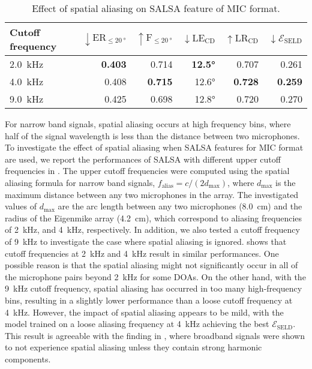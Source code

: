\documentclass[journal]{IEEEtran}
\newcommand{\Eseld}{$\mathcal{E}_\text{SELD}$\xspace}
\begin{document}
\begin{table}[t]
    \centering
    \setlength\tabcolsep{3pt}
    \caption{Effect of spatial aliasing on SALSA feature of MIC format.}
    \noindent\begin{tabularx}{\columnwidth}{Xrrrrr}
    \toprule 
        Cutoff frequency 
        & $\downarrow \text{ER}_{\le \SI{20}{\degree}}$ 
        & $\uparrow \text{F}_{\le \SI{20}{\degree}}$
        & $\downarrow \text{LE}_\text{CD}$
        & $\uparrow \text{LR}_\text{CD}$ 
        & $\downarrow \mathcal{E}_\text{SELD}$ \\
    \midrule
        \SI{2.0}{\kilo\hertz}          & \bf{0.403} & 0.714 & \bf{12.5\si{\degree}} & 0.707 & 0.261 \\
        \SI{4.0}{\kilo\hertz}          & 0.408 & \bf{0.715} & 12.6\si{\degree} & \bf{0.728} & \bf{0.259} \\
        \SI{9.0}{\kilo\hertz}          & 0.425 & 0.698 & 12.8\si{\degree} & 0.720 & 0.270 \\
    \bottomrule
    \end{tabularx}
    \label{tab:salsa_mic_aliasing}
\end{table}

For narrow band signals, spatial aliasing occurs at high frequency bins, where half of the signal wavelength is less than the distance between two microphones. 
To investigate the effect of spatial aliasing when SALSA features for MIC format are used, we report the performances of SALSA with different upper cutoff frequencies in . The upper cutoff frequencies were computed using the spatial aliasing formula for narrow band signals, $f_\text{alias}=c/(2d_\text{max})$, where $d_\text{max}$ is the maximum distance between any two microphones in the array. The investigated values of $d_\text{max}$ are the arc length between any two microphones (\SI{8.0}{\centi\meter}) and the radius of the Eigenmike array (\SI{4.2}{\centi\meter}), which correspond to aliasing frequencies of \SI{2}{\kilo\hertz}, and \SI{4}{\kilo\hertz}, respectively. In addition, we also tested a cutoff frequency of \SI{9}{\kilo\hertz} to investigate the case where spatial aliasing is ignored.  shows that cutoff frequencies at \SI{2}{\kilo\hertz} and \SI{4}{\kilo\hertz} result in similar performances. One possible reason is that the spatial aliasing might not significantly occur in all of the microphone pairs beyond \SI{2}{\kilo\hertz} for some DOAs. On the other hand, with the \SI{9}{\kilo\hertz} cutoff frequency, spatial aliasing has occurred in too many high-frequency bins, resulting in a slightly lower performance than a loose cutoff frequency at \SI{4}{\kilo\hertz}. However, the impact of spatial aliasing appears to be mild, with the model trained on a loose aliasing frequency at \SI{4}{\kilo\hertz} achieving the best \Eseld. This result is agreeable with the finding in \cite{Dmochowski2009OnArrays}, where broadband signals were shown to not experience spatial aliasing unless they contain strong harmonic components. 
\end{document}

